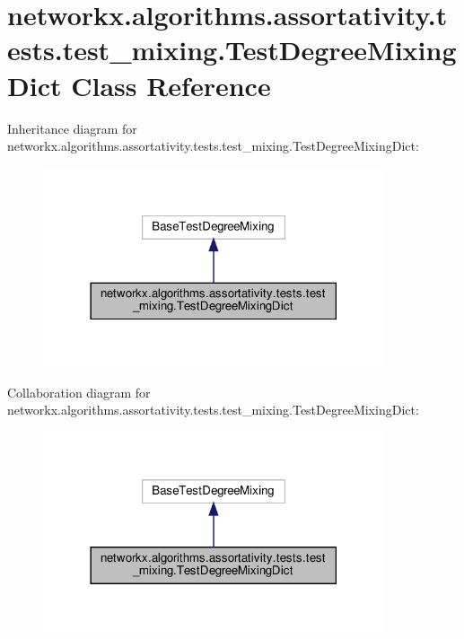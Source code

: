 \hypertarget{classnetworkx_1_1algorithms_1_1assortativity_1_1tests_1_1test__mixing_1_1TestDegreeMixingDict}{}\section{networkx.\+algorithms.\+assortativity.\+tests.\+test\+\_\+mixing.\+Test\+Degree\+Mixing\+Dict Class Reference}
\label{classnetworkx_1_1algorithms_1_1assortativity_1_1tests_1_1test__mixing_1_1TestDegreeMixingDict}


Inheritance diagram for networkx.\+algorithms.\+assortativity.\+tests.\+test\+\_\+mixing.\+Test\+Degree\+Mixing\+Dict\+:
\nopagebreak
\begin{figure}[H]
\begin{center}
\leavevmode
\includegraphics[width=285pt]{classnetworkx_1_1algorithms_1_1assortativity_1_1tests_1_1test__mixing_1_1TestDegreeMixingDict__inherit__graph}
\end{center}
\end{figure}


Collaboration diagram for networkx.\+algorithms.\+assortativity.\+tests.\+test\+\_\+mixing.\+Test\+Degree\+Mixing\+Dict\+:
\nopagebreak
\begin{figure}[H]
\begin{center}
\leavevmode
\includegraphics[width=285pt]{classnetworkx_1_1algorithms_1_1assortativity_1_1tests_1_1test__mixing_1_1TestDegreeMixingDict__coll__graph}
\end{center}
\end{figure}

